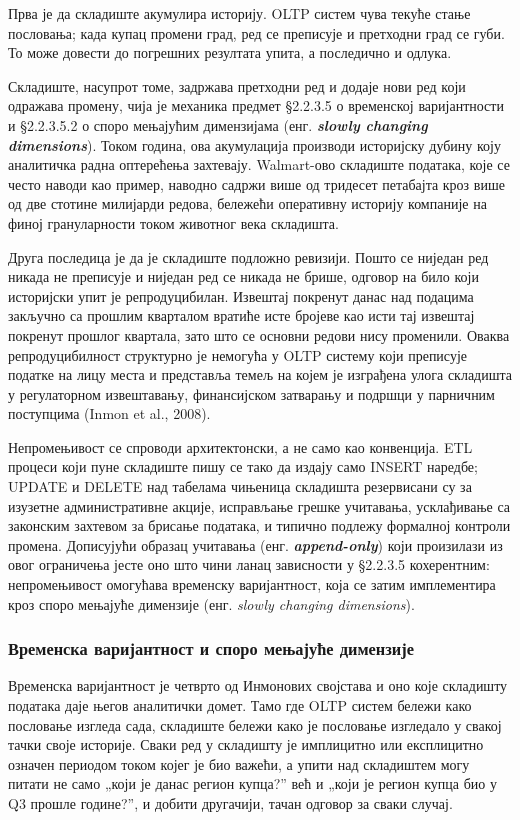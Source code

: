 Прва је да складиште акумулира историју. OLTP систем чува текуће стање пословања; када купац промени град, ред се преписује и претходни град се губи. То може довести до погрешних резултата упита, а последично и одлука.

Складиште, насупрот томе, задржава претходни ред и додаје нови ред који одражава промену, чија је механика предмет §2.2.3.5 о временској варијантности и §2.2.3.5.2 о споро мењајућим димензијама (енг. \textbf{\textit{slowly changing dimensions}}). Током година, ова акумулација производи историјску дубину коју аналитичка радна оптерећења захтевају. Walmart-ово складиште података, које се често наводи као пример, наводно садржи више од тридесет петабајта кроз више од две стотине милијарди редова, бележећи оперативну историју компаније на финој грануларности током животног века складишта.

Друга последица је да је складиште подложно ревизији. Пошто се ниједан ред никада не преписује и ниједан ред се никада не брише, одговор на било који историјски упит је репродуцибилан. Извештај покренут данас над подацима закључно са прошлим кварталом вратиће исте бројеве као исти тај извештај покренут прошлог квартала, зато што се основни редови нису променили. Оваква репродуцибилност структурно је немогућа у OLTP систему који преписује податке на лицу места и представља темељ на којем је изграђена улога складишта у регулаторном извештавању, финансијском затварању и подршци у парничним поступцима (Inmon et al., 2008).

Непромењивост се спроводи архитектонски, а не само као конвенција. ETL процеси који пуне складиште пишу се тако да издају само INSERT наредбе; UPDATE и DELETE над табелама чињеница складишта резервисани су за изузетне административне акције, исправљање грешке учитавања, усклађивање са законским захтевом за брисање података, и типично подлежу формалној контроли промена. Дописујући образац учитавања (енг. \textbf{\textit{append-only}}) који произилази из овог ограничења јесте оно што чини ланац зависности у §2.2.3.5 кохерентним: непромењивост омогућава временску варијантност, која се затим имплементира кроз споро мењајуће димензије (енг. \textit{slowly changing dimensions}).

\subsubsection{Временска варијантност и споро мењајуће димензије}
Временска варијантност је четврто од Инмонових својстава и оно које складишту података даје његов аналитички домет. Тамо где OLTP систем бележи како пословање изгледа сада, складиште бележи како је пословање изгледало у свакој тачки своје историје. Сваки ред у складишту је имплицитно или експлицитно означен периодом током којег је био важећи, а упити над складиштем могу питати не само „који је данас регион купца?” већ и „који је регион купца био у Q3 прошле године?”, и добити другачији, тачан одговор за сваки случај.

